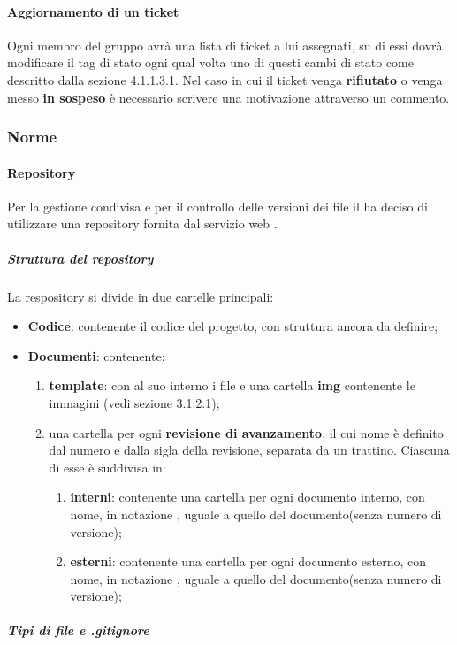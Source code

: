 	\paragraph{Aggiornamento di un ticket}
	Ogni membro del gruppo avrà una lista di ticket a lui assegnati, su di essi dovrà modificare il tag di stato ogni qual volta uno di questi cambi di stato come descritto dalla sezione 4.1.1.3.1. Nel caso in cui il ticket venga \textbf{rifiutato} o venga messo \textbf{in sospeso} è necessario scrivere una motivazione attraverso un commento.
\subsubsection{Norme}
	\paragraph{Repository}
	Per la gestione condivisa e per il controllo delle versioni dei file il  ha deciso di utilizzare una repository fornita dal servizio web .
		\subparagraph{Struttura del repository}
		La respository si divide in due cartelle principali:
		\begin{itemize}
			\item \textbf{Codice}: contenente il codice del progetto, con struttura ancora da definire;
			\item \textbf{Documenti}: contenente:
			\begin{enumerate}
				\item \textbf{template}: con al suo interno i file  e una cartella \textbf{img} contenente le immagini (vedi sezione 3.1.2.1);
				\item una cartella per ogni \textbf{revisione di avanzamento}, il cui nome è definito dal numero e dalla sigla della revisione, separata da un trattino. Ciascuna di esse è suddivisa in:
				\begin{enumerate}
					\item \textbf{interni}: contenente una cartella per ogni documento interno, con nome, in notazione , uguale a quello del documento(senza numero di versione);
					\item \textbf{esterni}: contenente una cartella per ogni documento esterno, con nome, in notazione , uguale a quello del documento(senza numero di versione);
				\end{enumerate}
			\end{enumerate}
		\end{itemize}
		\subparagraph{Tipi di file e .gitignore}
